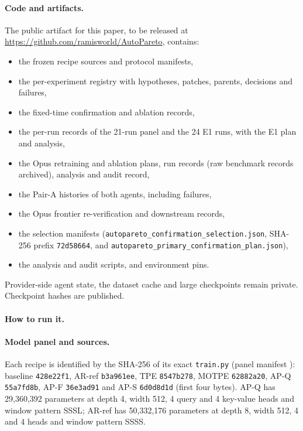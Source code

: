 \documentclass{article}
\newif\ifshowhumanmarkers \showhumanmarkersfalse
\newcommand{\releasepending}{\ifshowhumanmarkers{\color{humanframe}\sffamily\scriptsize\bfseries[RELEASE PENDING]}\ \fi}
\begin{document}
\paragraph{Code and artifacts.} \releasepending The public artifact for this paper, to be released at \url{https://github.com/ramisworld/AutoPareto}, contains:
{\setlength{\leftmargini}{1.2em}\begin{itemize}\setlength{\itemsep}{0pt}\setlength{\parskip}{0pt}\setlength{\topsep}{2pt}
\item the frozen recipe sources and protocol manifests,
\item the per-experiment registry with hypotheses, patches, parents, decisions and failures,
\item the fixed-time confirmation and ablation records,
\item the per-run records of the 21-run panel and the 24 E1 runs, with the E1 plan and analysis,
\item the Opus retraining and ablation plans, run records (raw benchmark records archived), analysis and audit record,
\item the Pair-A histories of both agents, including failures,
\item the Opus frontier re-verification and downstream records,
\item the selection manifests (\texttt{autopareto\_confirmation\_selection.json}, SHA-256 prefix \texttt{72d58664}, and \texttt{autopareto\_primary\_confirmation\_plan.json}),
\item the analysis and audit scripts, and environment pins.
\end{itemize}}
Provider-side agent state, the dataset cache and large checkpoints remain private. Checkpoint hashes are published.

\paragraph{How to run it.}\label{app:howto} 

\paragraph{Model panel and sources.} Each recipe is identified by the SHA-256 of its exact \texttt{train.py} (panel manifest ): baseline \texttt{428e22f1}, AR-ref \texttt{b3a961ee}, TPE \texttt{8547b278}, MOTPE \texttt{62882a20}, AP-Q \texttt{55a7fd8b}, AP-F \texttt{36e3ad91} and AP-S \texttt{6d0d8d1d} (first four bytes). AP-Q has 29,360,392 parameters at depth 4, width 512, 4 query and 4 key-value heads and window pattern SSSL; AR-ref has 50,332,176 parameters at depth 8, width 512, 4 and 4 heads and window pattern SSSS.
\end{document}
